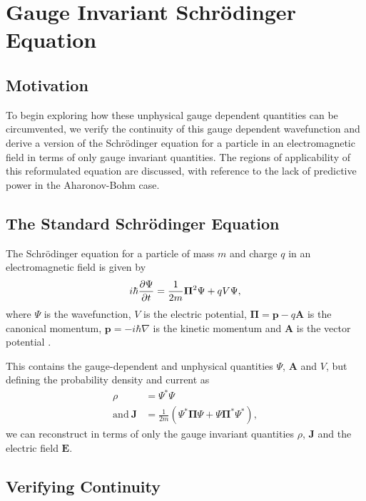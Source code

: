 \section{Gauge Invariant Schr\"odinger Equation}
\label{sec:gise}

\subsection{Motivation}

To begin exploring how these unphysical gauge dependent quantities can be
circumvented, we verify the continuity of this gauge dependent wavefunction and
derive a version of the Schr\"odinger equation for a particle in an
electromagnetic field in terms of only gauge invariant quantities. The regions
of applicability of this reformulated equation are discussed, with reference to
the lack of predictive power in the Aharonov-Bohm case.

\subsection{The Standard Schr\"odinger Equation}

The Schr\"odinger equation for a particle of mass $m$ and charge $q$ in an
electromagnetic field is given by
\begin{align}
    i \hbar \frac{\partial \Psi}{\partial t} = \frac{1}{2m}\mathbf{\Pi}^2 \Psi + qV \Psi
    \label{eqn:schrodinger},
\end{align}
where $\Psi$ is the wavefunction, $V$ is the electric potential, $\mathbf{\Pi} =
\mathbf{p} - q\mathbf{A}$ is the canonical momentum, $\mathbf{p} = - i \hbar
\nabla$ is the kinetic momentum and $\mathbf{A}$ is the vector potential
\cite[Chapter 4]{aharonov-rohrlich}\cite[Page 456]{landau-lifshitz-quantum}.

This contains the gauge-dependent and unphysical quantities $\Psi$, $\mathbf{A}$
and $V$, but defining the probability density and current as
\begin{align}
    \rho &= \Psi^*\Psi \\
    \mathrm{and}~ \mathbf{J} &= \frac{1}{2m}\left( \Psi^* \mathbf{\Pi}
        \Psi + \Psi \mathbf{\Pi}^* \Psi^* \right),
\end{align}
we can reconstruct  in terms of only the gauge
invariant quantities $\rho$, $\mathbf{J}$ and the electric field $\mathbf{E}$.

\subsection{Verifying Continuity}

